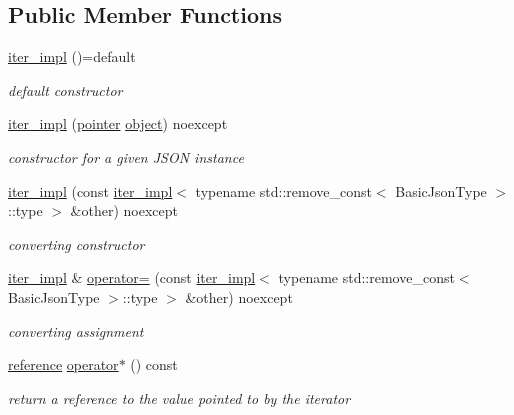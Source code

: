 \subsection*{Public Member Functions}
\begin{DoxyCompactItemize}
\item 
\hyperlink{classnlohmann_1_1detail_1_1iter__impl_a19aa457f9c4af1b7e3af59839132cc5c}{iter\+\_\+impl} ()=default
\begin{DoxyCompactList}\small\item\em default constructor \end{DoxyCompactList}\item 
\hyperlink{classnlohmann_1_1detail_1_1iter__impl_a88a00484ac201c52fc5f613d88a2918b}{iter\+\_\+impl} (\hyperlink{classnlohmann_1_1detail_1_1iter__impl_a69e52f890ce8c556fd68ce109e24b360}{pointer} \hyperlink{namespacenlohmann_1_1detail_a90aa5ef615aa8305e9ea20d8a947980faa8cfde6331bd59eb2ac96f8911c4b666}{object}) noexcept
\begin{DoxyCompactList}\small\item\em constructor for a given J\+S\+ON instance \end{DoxyCompactList}\item 
\hyperlink{classnlohmann_1_1detail_1_1iter__impl_a867f7eb55091be31b013adb3e46816d3}{iter\+\_\+impl} (const \hyperlink{classnlohmann_1_1detail_1_1iter__impl}{iter\+\_\+impl}$<$ typename std\+::remove\+\_\+const$<$ Basic\+Json\+Type $>$\+::type $>$ \&other) noexcept
\begin{DoxyCompactList}\small\item\em converting constructor \end{DoxyCompactList}\item 
\hyperlink{classnlohmann_1_1detail_1_1iter__impl}{iter\+\_\+impl} \& \hyperlink{classnlohmann_1_1detail_1_1iter__impl_a7159ed1cfe7c423a2baef8bea0c94509}{operator=} (const \hyperlink{classnlohmann_1_1detail_1_1iter__impl}{iter\+\_\+impl}$<$ typename std\+::remove\+\_\+const$<$ Basic\+Json\+Type $>$\+::type $>$ \&other) noexcept
\begin{DoxyCompactList}\small\item\em converting assignment \end{DoxyCompactList}\item 
\hyperlink{classnlohmann_1_1detail_1_1iter__impl_a5be8001be099c6b82310f4d387b953ce}{reference} \hyperlink{classnlohmann_1_1detail_1_1iter__impl_adafa65198cad0cc7295d21cfa7678e6e}{operator$\ast$} () const 
\begin{DoxyCompactList}\small\item\em return a reference to the value pointed to by the iterator \end{DoxyCompactList}\item 

\end{DoxyCompactItemize}
